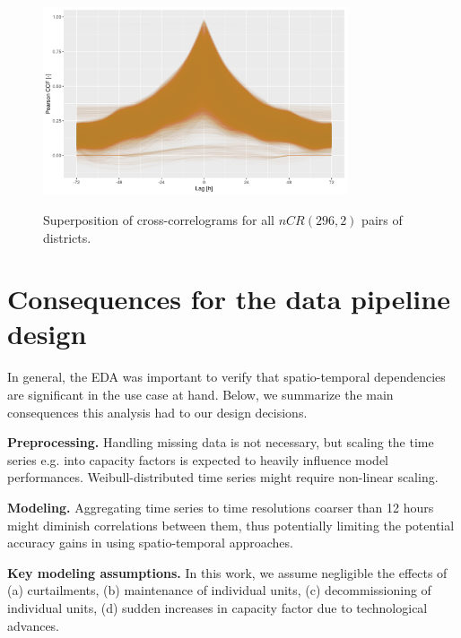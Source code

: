 \begin{figure}[H]%
	\centering
    \caption{Superposition of cross-correlograms for all $nCR(296, 2)$ pairs of districts.}
    \includegraphics[width=0.8\textwidth]{ccf-all_fav}
	\label{fig:ccf_all}
\end{figure}


\section{Consequences for the data pipeline design}\label{sec:eda_conclusions}

In general, the EDA was important to verify that spatio-temporal dependencies are significant in the use case at hand.
Below, we summarize the main consequences this analysis had to our design decisions.

\vspace{1em}
\noindent
\textbf{Preprocessing.} Handling missing data is not necessary, but scaling the time series e.g. into capacity factors is expected to heavily influence model performances. Weibull-distributed time series might require non-linear scaling.

\vspace{1em}
\noindent
\textbf{Modeling.} Aggregating time series to time resolutions coarser than 12 hours might diminish correlations between them, thus potentially limiting the potential accuracy gains in using spatio-temporal approaches.

\vspace{1em}
\noindent
\textbf{Key modeling assumptions.} In this work, we assume negligible the effects of (a) curtailments, (b) maintenance of individual units, (c) decommissioning of individual units, (d) sudden increases in capacity factor due to technological advances.
